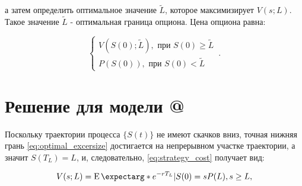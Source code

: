 \documentclass[a4paper,12pt]{article}
\makeatletter
\theoremstyle{definition}
\newcommand*{\rom}[1]{\expandafter\@slowromancap\romannumeral #1@}
\newcommand{\expect}{\operatorname{E}\expectarg}
\makeatother
\begin{document}
а затем определить оптимальное значение $\widetilde{L}$, которое
максимизирует $V(s; L)$. Такое значение $\widetilde{L}$ - оптимальная граница опциона. Цена опциона равна:

\begin{equation}\label{eq:option_price}
    \begin{cases}
      V(S(0); \widetilde{L}), \text{ при } S(0) \ge \widetilde{L}\\
      P(S(0)), \text{ при } S(0) < \widetilde{L}
    \end{cases}\,.
\end{equation}

\section{Решение для модели \rom{1}}

Поскольку траектории процесса $\{S(t)\}$ не имеют скачков вниз, точная нижняя грань \eqref{eq:optimal_excersize} достигается на непрерывном участке траектории, а значит $S(T_L) = L$, и, следовательно, \eqref{eq:strategy_cost} получает вид:

\begin{equation}\label{eq:strategy_c1}
V(s; L) = \expect*{e^{-rT_L} | S(0) = s} P(L), s \ge L,
\end{equation}
\end{document}
